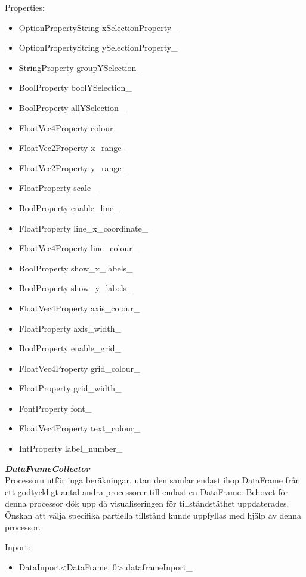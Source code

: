 Properties:
\begin{itemize}
    \setlength\itemsep{0em}
    \item OptionPropertyString xSelectionProperty\_
    \item OptionPropertyString ySelectionProperty\_
    \item StringProperty groupYSelection\_
    \item BoolProperty boolYSelection\_
    \item BoolProperty allYSelection\_
    \item FloatVec4Property colour\_
    \item FloatVec2Property x\_range\_
    \item FloatVec2Property y\_range\_
    \item FloatProperty scale\_
    \item BoolProperty enable\_line\_
    \item FloatProperty line\_x\_coordinate\_
    \item FloatVec4Property line\_colour\_
    \item BoolProperty show\_x\_labels\_
    \item BoolProperty show\_y\_labels\_
    \item FloatVec4Property axis\_colour\_
    \item FloatProperty axis\_width\_
    \item BoolProperty enable\_grid\_
    \item FloatVec4Property grid\_colour\_
    \item FloatProperty grid\_width\_
    \item FontProperty font\_
    \item FloatVec4Property text\_colour\_
    \item IntProperty label\_number\_
\end{itemize}

\textit{\textbf{DataFrameCollector}}\\
Processorn utför inga beräkningar, utan den samlar endast ihop DataFrame från ett godtyckligt antal andra processorer till endast en DataFrame. Behovet för denna processor dök upp då visualiseringen för tillståndstäthet uppdaterades. Önskan att välja specifika partiella tillstånd kunde uppfyllas med hjälp av denna processor.

\newpage

Inport:
\begin{itemize}
    \item DataInport<DataFrame, 0> dataframeInport\_
\end{itemize}

